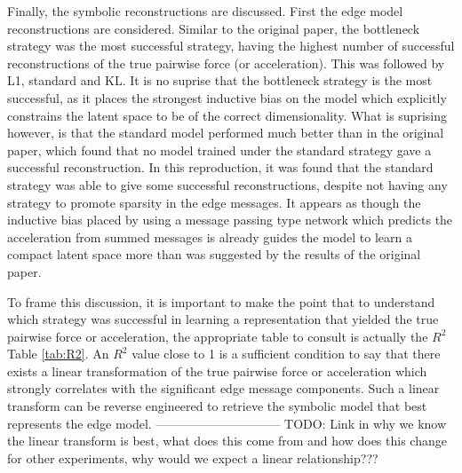 \documentclass[11pt]{article}
\begin{document}
Finally, the symbolic reconstructions are discussed. First the edge model reconstructions are considered. Similar to the original paper, the bottleneck strategy was the most successful strategy, having the highest number of successful reconstructions of the true pairwise force (or acceleration). This was followed by L1, standard and KL. It is no suprise that the bottleneck strategy is the most successful, as it places the strongest inductive bias on the model which explicitly constrains the latent space to be of the correct dimensionality. What is suprising however, is that the standard model performed much better than in the original paper, which found that no model trained under the standard strategy gave a successful reconstruction. In this reproduction, it was found that the standard strategy was able to give some successful reconstructions, despite not having any strategy to promote sparsity in the edge messages. It appears as though the inductive bias placed by using a message passing type network which predicts the acceleration from summed messages is already guides the model to learn a compact latent space more than was suggested by the results of the original paper.

To frame this discussion, it is important to make the point that to understand which strategy was successful in learning a representation that yielded the true pairwise force or acceleration, the appropriate table to consult is actually the $R^2$ Table \ref{tab:R2}. An $R^2$ value close to 1 is a sufficient condition to say that there exists a linear transformation of the true pairwise force or acceleration which strongly correlates with the significant edge message components. Such a linear transform can be reverse engineered to retrieve the symbolic model that best represents the edge model. 
------------------------------
TODO: Link in why we know the linear transform is best, what does this come from and how does this change for other experiments, why would we expect a linear relationship???
\end{document}
